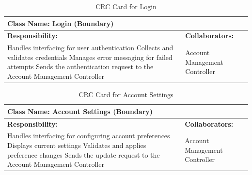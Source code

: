 \documentclass[]{article}
\begin{document}
\begin{table}[H]
    \centering
    \caption{CRC Card for Login}
    \vspace{1mm}
    \begin{tabular}{|p{7.5cm}|p{7.5cm}|}
    \hline 
    \multicolumn{2}{|l|}{\textbf{Class Name: Login (Boundary)}} \\
    \hline
    \textbf{Responsibility:} & \textbf{Collaborators:} \\
    \hline
        Handles interfacing for user authentication \newline
        Collects and validates credentials \newline
        Manages error messaging for failed attempts \newline
        Sends the authentication request to the Account Management Controller \newline
        &
        Account Management Controller \\
    \hline
    \end{tabular}
\end{table}
\begin{table}[H]
    \centering
    \caption{CRC Card for Account Settings}
    \vspace{1mm}
    \begin{tabular}{|p{7.5cm}|p{7.5cm}|}
    \hline 
    \multicolumn{2}{|l|}{\textbf{Class Name: Account Settings (Boundary)}} \\
    \hline
    \textbf{Responsibility:} & \textbf{Collaborators:} \\
    \hline
        Handles interfacing for configuring account preferences \newline
        Displays current settings \newline
        Validates and applies preference changes \newline
        Sends the update request to the Account Management Controller \newline
        &
        Account Management Controller \\
    \hline
    \end{tabular}
\end{table}
\end{document}

